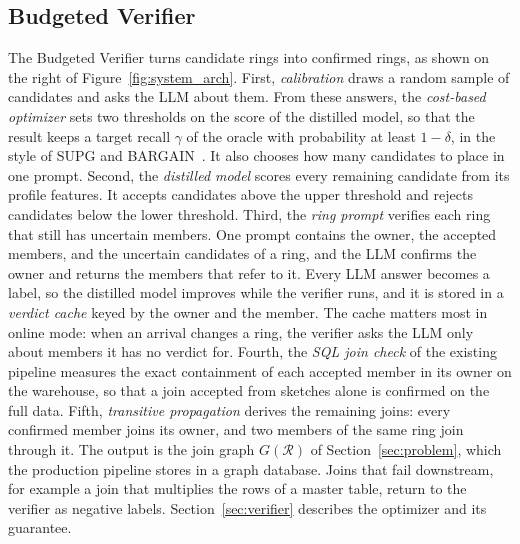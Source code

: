 \subsection{Budgeted Verifier}
\label{sec:arch_verifier}
The Budgeted Verifier turns candidate rings into confirmed rings, as shown on the right of Figure~\ref{fig:system_arch}.
First, \emph{calibration} draws a random sample of candidates and asks the LLM about them.
From these answers, the \emph{cost-based optimizer} sets two thresholds on the score of the distilled model, so that the result keeps a target recall $\gamma$ of the oracle with probability at least $1-\delta$, in the style of SUPG and BARGAIN~\cite{SUPG,BARGAIN}.
It also chooses how many candidates to place in one prompt.
Second, the \emph{distilled model} scores every remaining candidate from its profile features.
It accepts candidates above the upper threshold and rejects candidates below the lower threshold.
Third, the \emph{ring prompt} verifies each ring that still has uncertain members.
One prompt contains the owner, the accepted members, and the uncertain candidates of a ring, and the LLM confirms the owner and returns the members that refer to it.
Every LLM answer becomes a label, so the distilled model improves while the verifier runs, and it is stored in a \emph{verdict cache} keyed by the owner and the member.
The cache matters most in online mode: when an arrival changes a ring, the verifier asks the LLM only about members it has no verdict for.
Fourth, the \emph{SQL join check} of the existing pipeline measures the exact containment of each accepted member in its owner on the warehouse, so that a join accepted from sketches alone is confirmed on the full data.
Fifth, \emph{transitive propagation} derives the remaining joins: every confirmed member joins its owner, and two members of the same ring join through it.
The output is the join graph $G(\mathcal{R})$ of Section~\ref{sec:problem}, which the production pipeline stores in a graph database.
Joins that fail downstream, for example a join that multiplies the rows of a master table, return to the verifier as negative labels.
Section~\ref{sec:verifier} describes the optimizer and its guarantee.

